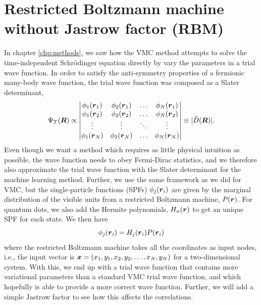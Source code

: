 \section{Restricted Boltzmann machine without Jastrow factor (RBM)} \label{sec:rbm}
In chapter \ref{chp:methods}, we saw how the VMC method attempts to solve the time-independent Schrödinger equation directly by vary the parameters in a trial wave function. In order to satisfy the anti-symmetry properties of a fermionic many-body wave function, the trial wave function was composed as a Slater determinant,
\begin{equation}
\Psi_T(\boldsymbol{{R}})\propto
\begin{vmatrix}
\phi_1(\boldsymbol{r}_1) & \phi_2(\boldsymbol{r}_1) & \hdots & \phi_N(\boldsymbol{r}_1)\\
\phi_1(\boldsymbol{r}_2) & \phi_2(\boldsymbol{r}_2) & \hdots & \phi_N(\boldsymbol{r}_2)\\
\vdots & \vdots & \ddots & \vdots \\
\phi_1(\boldsymbol{r}_N) & \phi_2(\boldsymbol{r}_N) & \hdots & \phi_N(\boldsymbol{r}_N)
\end{vmatrix}\equiv|\hat{D}(\boldsymbol{{R}})|.
\end{equation}
Even though we want a method which requires as little physical intuition as possible, the wave function needs to obey Fermi-Dirac statistics, and we therefore also approximate the trial wave function with the Slater determinant for the machine learning method. Further, we use the same framework as we did for VMC, but the single-particle functions (SPFs) $\phi_j(\boldsymbol{{r}}_i)$ are given by the marginal distribution of the visible units from a restricted Boltzmann machine, $P(\boldsymbol{{r}})$. For quantum dots, we also add the Hermite polynomials, $H_n(\boldsymbol{{r}})$ to get an unique SPF for each state. We then have
\begin{equation}
\phi_j(\boldsymbol{{r}}_i)=H_j(\boldsymbol{{r}}_i)P(\boldsymbol{{r}}_i)
\end{equation}
where the restricted Boltzmann machine takes all the coordinates as input nodes, i.e., the input vector is $\boldsymbol{{x}}=(x_1, y_1, x_2, y_2, \hdots, x_N, y_N)$ for a two-dimensional system. With this, we end up with a trial wave function that contains more variational parameters than a standard VMC trial wave function, and which hopefully is able to provide a more correct wave function. Further, we will add a simple Jastrow factor to see how this affects the correlations.


